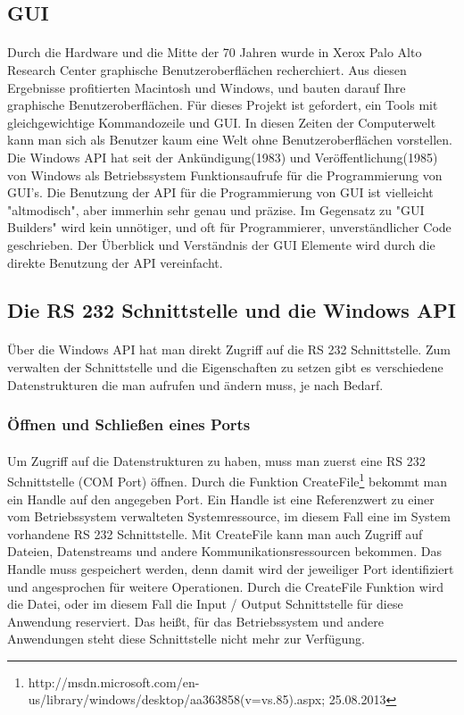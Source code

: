 \subsection{GUI}
\paragraph{}
Durch die Hardware und die Mitte der 70 Jahren wurde in Xerox Palo Alto Research Center graphische Benutzeroberflächen recherchiert. Aus diesen Ergebnisse profitierten Macintosh und Windows, und bauten darauf Ihre graphische Benutzeroberflächen. Für dieses Projekt ist gefordert, ein Tools mit gleichgewichtige Kommandozeile und GUI. In diesen Zeiten der Computerwelt kann man sich als Benutzer kaum eine Welt ohne Benutzeroberflächen vorstellen. Die Windows API hat seit der Ankündigung(1983) und Veröffentlichung(1985) von Windows als Betriebssystem Funktionsaufrufe für die Programmierung von GUI's. Die Benutzung der API für die Programmierung von GUI ist vielleicht "altmodisch", aber immerhin sehr genau und präzise. Im Gegensatz zu "GUI Builders" wird kein unnötiger, und oft für Programmierer, unverständlicher Code geschrieben. Der Überblick und Verständnis der GUI Elemente wird durch die direkte Benutzung der API vereinfacht.

\subsection{Die RS 232 Schnittstelle und die Windows API}
\paragraph{}
Über die Windows API hat man direkt Zugriff auf die RS 232 Schnittstelle. Zum verwalten der Schnittstelle und die Eigenschaften zu setzen gibt es verschiedene Datenstrukturen die man aufrufen und ändern muss, je nach Bedarf.

\subsubsection{Öffnen und Schließen eines Ports}
\paragraph{}
Um Zugriff auf die Datenstrukturen zu haben, muss man zuerst eine RS 232 Schnittstelle (COM Port) öffnen. Durch die Funktion CreateFile\footnote{http://msdn.microsoft.com/en-us/library/windows/desktop/aa363858(v=vs.85).aspx; 25.08.2013} bekommt man ein Handle auf den angegeben Port. Ein Handle ist eine Referenzwert zu einer vom Betriebssystem verwalteten Systemressource, im diesem Fall eine im System vorhandene RS 232 Schnittstelle. Mit CreateFile kann man auch Zugriff auf Dateien, Datenstreams und andere Kommunikationsressourcen bekommen. Das Handle muss gespeichert werden, denn damit wird der jeweiliger Port identifiziert und angesprochen für weitere Operationen. Durch die CreateFile Funktion wird die Datei, oder im diesem Fall die Input / Output Schnittstelle für diese Anwendung reserviert. Das heißt, für das Betriebssystem und andere Anwendungen steht diese Schnittstelle nicht mehr zur Verfügung.

